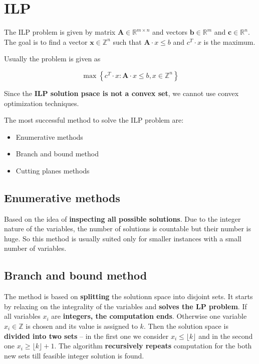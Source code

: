 \documentclass[
  czech,
  a4paperpaper,
]{article}
\author{}
\date{}
\providecommand{\tightlist}{%
  \setlength{\itemsep}{0pt}\setlength{\parskip}{0pt}}
\begin{document}
\hypertarget{ilp}{%
\section{ILP}\label{ilp}}

The ILP problem is given by matrix
\(\mathbf{A} \in \mathbb{R}^{m \times n}\) and vectors
\(\mathbf{b} \in \mathbb{R}^m\) and \(\mathbf{c} \in \mathbb{R}^n\). The
goal is to find a vector \(\mathbf{x} \in \mathbb{Z}^n\) such that
\(\mathbf{A} \cdot x \leq b\) and \(c^T \cdot x\) is the maximum.

Usually the problem is given as

\[\max \left\{ c^T \cdot x : \mathbf{A} \cdot x \leq b, x \in \mathbb{Z}^n \right\}\]

Since the \textbf{ILP solution psace is not a convex set}, we cannot use
convex optimization techniques.

The most successful method to solve the ILP problem are:

\begin{itemize}
\tightlist
\item
  Enumerative methods
\item
  Branch and bound method
\item
  Cutting planes methods
\end{itemize}

\hypertarget{enumerative-methods}{%
\subsection{Enumerative methods}\label{enumerative-methods}}

Based on the idea of \textbf{inspecting all possible solutions}. Due to
the integer nature of the variables, the number of solutions is
countable but their number is huge. So this method is usually suited
only for smaller instances with a small number of variables.

\hypertarget{branch-and-bound-method}{%
\subsection{Branch and bound method}\label{branch-and-bound-method}}

The method is based on \textbf{splitting} the solutionn space into
disjoint sets. It starts by relaxing on the integrality of the variables
and \textbf{solves the LP problem}. If all variables \(x_i\) are
\textbf{integers, the computation ends}. Otherwise one variable
\(x_i \in \mathbb{Z}\) is chosen and its value is assigned to \(k\).
Then the solution space is \textbf{divided into two sets} -- in the
first one we consider \(x_i \leq \lfloor k \rfloor\) and in the second
one \(x_i \geq \lfloor k \rfloor + 1\). The algorithm
\textbf{recursively repeats} computation for the both new sets till
feasible integer solution is found.
\end{document}
